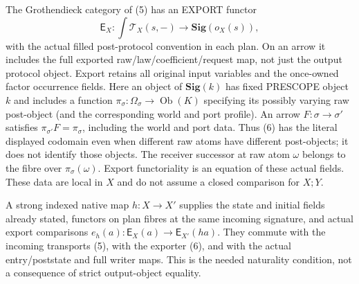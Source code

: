 \documentclass[11pt]{article}\usepackage{amsmath,amssymb,amsthm,geometry}\geometry{margin=1in}
\begin{document}
The Grothendieck category of (5) has an EXPORT functor
\[
 \mathsf E_X:\int\mathcal T_X(s,-)\longrightarrow\mathbf{Sig}(o_X(s)),
                                                                    \tag{6}
\]
with the actual filled post-protocol convention in each plan. On an arrow it includes the full exported raw/law/coefficient/request map, not just the output protocol object. Export retains all original input variables and the once-owned factor occurrence fields. Here an object of $\mathbf{Sig}(k)$ has fixed PRESCOPE object $k$ and includes a function $\pi_\sigma:\Omega_\sigma\to\operatorname{Ob}(K)$ specifying its possibly varying raw post-object (and the corresponding world and port profile). An arrow $F:\sigma\to\sigma'$ satisfies $\pi_{\sigma'}F=\pi_\sigma$, including the world and port data. Thus (6) has the literal displayed codomain even when different raw atoms have different post-objects; it does not identify those objects. The receiver successor at raw atom $\omega$ belongs to the fibre over $\pi_\sigma(\omega)$. Export functoriality is an equation of these actual fields. These data are local in $X$ and do not assume a closed comparison for $X;Y$.

A strong indexed native map $h:X\to X'$ supplies the state and initial fields already stated, functors on plan fibres at the same incoming signature, and actual export comparisons
$e_h(a):\mathsf E_X(a)\to\mathsf E_{X'}(h a)$.
They commute with the incoming transports (5), with the exporter (6), and with the actual entry/poststate and full writer maps. This is the needed naturality condition, not a consequence of strict output-object equality.
\end{document}
